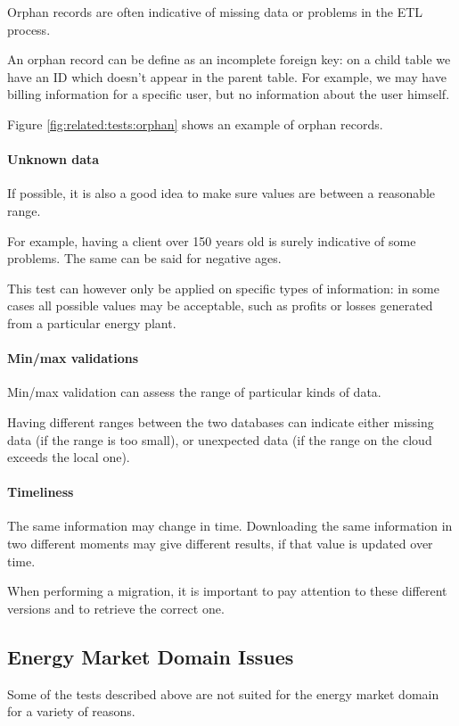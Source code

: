         Orphan records are often indicative of missing data or problems in the ETL process.
        
        An orphan record can be define as an incomplete foreign key: on a child table we have an ID which doesn't appear in the parent table.
        For example, we may have billing information for a specific user, but no information about the user himself.
        
        Figure \ref{fig:related:tests:orphan} shows an example of orphan records.
        
    \paragraph{Unknown data}
        If possible, it is also a good idea to make sure values are between a reasonable range.
        
        For example, having a client over 150 years old is surely indicative of some problems.
        The same can be said for negative ages.
        
        This test can however only be applied on specific types of information: in some cases all possible values may be acceptable, such as profits or losses generated from a particular energy plant.
    
    \paragraph{Min/max validations}
        Min/max validation can assess the range of particular kinds of data.
        
        Having different ranges between the two databases can indicate either missing data (if the range is too small), or unexpected data (if the range on the cloud exceeds the local one).
    
    \paragraph{Timeliness}
        The same information may change in time.
        Downloading the same information in two different moments may give different results, if that value is updated over time.
        
        When performing a migration, it is important to pay attention to these different versions and to retrieve the correct one.
        
    
\subsection{Energy Market Domain Issues}
    Some of the tests described above are not suited for the energy market domain for a variety of reasons.
    
